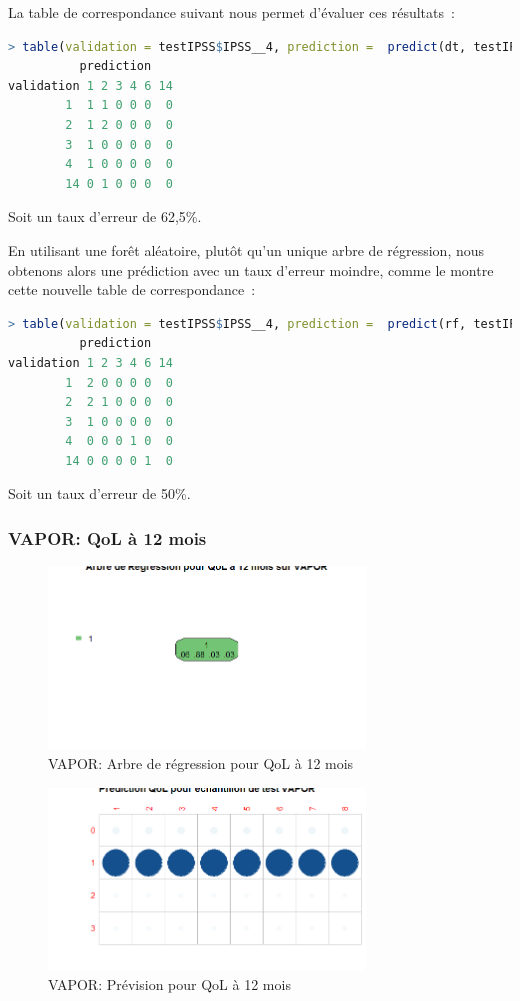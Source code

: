 La table de correspondance suivant nous permet d'évaluer ces résultats~:
\begin{lstlisting}[language=R]
> table(validation = testIPSS$IPSS__4, prediction =  predict(dt, testIPSS, type="class"))
          prediction
validation 1 2 3 4 6 14
        1  1 1 0 0 0  0
        2  1 2 0 0 0  0
        3  1 0 0 0 0  0
        4  1 0 0 0 0  0
        14 0 1 0 0 0  0
\end{lstlisting}
Soit un taux d'erreur de 62,5\%.

En utilisant une forêt aléatoire, plutôt qu'un unique arbre de régression, nous obtenons alors une
prédiction avec un taux d'erreur moindre, comme le montre cette nouvelle table de correspondance~:
\begin{lstlisting}[language=R]
> table(validation = testIPSS$IPSS__4, prediction =  predict(rf, testIPSS))
          prediction
validation 1 2 3 4 6 14
        1  2 0 0 0 0  0
        2  2 1 0 0 0  0
        3  1 0 0 0 0  0
        4  0 0 0 1 0  0
        14 0 0 0 0 1  0
\end{lstlisting}
Soit un taux d'erreur de 50\%.
        
\subsubsection{VAPOR: QoL à 12 mois}

\begin{figure}[H]
\centering
\includegraphics[width=0.75\textwidth]{../Fig/VAPOR/vapor-regtree-qol12.png}
\caption{VAPOR: Arbre de régression pour QoL à 12 mois}
\label{fig-vapor-regtree-qol12}
\end{figure}

\begin{figure}[H]
\centering
\includegraphics[width=0.75\textwidth]{../Fig/VAPOR/vapor-regtree-predict-qol12.png}
\caption{VAPOR: Prévision pour QoL à 12 mois}
\label{fig-vapor-regtree-predict-qol12}
\end{figure}

